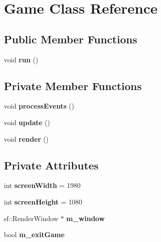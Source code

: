 \hypertarget{class_game}{}\section{Game Class Reference}
\label{class_game}
\subsection*{Public Member Functions}
\begin{DoxyCompactItemize}
\item 
\mbox{\label{class_game_a1ab78f5ed0d5ea879157357cf2fb2afa}} 
void {\bfseries run} ()
\end{DoxyCompactItemize}
\subsection*{Private Member Functions}
\begin{DoxyCompactItemize}
\item 
\mbox{\label{class_game_a79f698dda206dd7a9bed28b3f88bdc38}} 
void {\bfseries process\+Events} ()
\item 
\mbox{\label{class_game_a79df6376b332d63c9eca0dcee30305c3}} 
void {\bfseries update} ()
\item 
\mbox{\label{class_game_a15ddd769261d923827a3cdf41499c843}} 
void {\bfseries render} ()
\end{DoxyCompactItemize}
\subsection*{Private Attributes}
\begin{DoxyCompactItemize}
\item 
\mbox{\label{class_game_ab1ca40d8527bb09e773bb97030b7a5cc}} 
int {\bfseries screen\+Width} = 1980
\item 
\mbox{\label{class_game_a329351d67993953391a6a65db536c017}} 
int {\bfseries screen\+Height} = 1080
\item 
\mbox{\label{class_game_aa1aa5d5c0048064e80f7b7684a323d32}} 
sf\+::\+Render\+Window $\ast$ {\bfseries m\+\_\+window}
\item 
\mbox{\label{class_game_a5452d49a7b3f2d2ea3c7e2072fe8a828}} 
bool {\bfseries m\+\_\+exit\+Game}
\end{DoxyCompactItemize}


